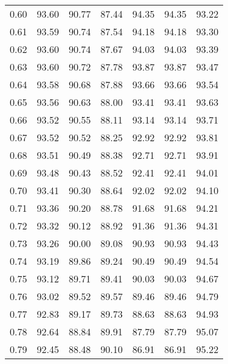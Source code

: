 \begin{tabular}{|c|c|c|c|c|c|c|}
      0.60 &     93.60 &     90.77 &      87.44 &   94.35 &      94.35 &         93.22 \\
      0.61 &     93.59 &     90.74 &      87.54 &   94.18 &      94.18 &         93.30 \\
      0.62 &     93.60 &     90.74 &      87.67 &   94.03 &      94.03 &         93.39 \\
      0.63 &     93.60 &     90.72 &      87.78 &   93.87 &      93.87 &         93.47 \\
      0.64 &     93.58 &     90.68 &      87.88 &   93.66 &      93.66 &         93.54 \\
      0.65 &     93.56 &     90.63 &      88.00 &   93.41 &      93.41 &         93.63 \\
      0.66 &     93.52 &     90.55 &      88.11 &   93.14 &      93.14 &         93.71 \\
      0.67 &     93.52 &     90.52 &      88.25 &   92.92 &      92.92 &         93.81 \\
      0.68 &     93.51 &     90.49 &      88.38 &   92.71 &      92.71 &         93.91 \\
      0.69 &     93.48 &     90.43 &      88.52 &   92.41 &      92.41 &         94.01 \\
      0.70 &     93.41 &     90.30 &      88.64 &   92.02 &      92.02 &         94.10 \\
      0.71 &     93.36 &     90.20 &      88.78 &   91.68 &      91.68 &         94.21 \\
      0.72 &     93.32 &     90.12 &      88.92 &   91.36 &      91.36 &         94.31 \\
      0.73 &     93.26 &     90.00 &      89.08 &   90.93 &      90.93 &         94.43 \\
      0.74 &     93.19 &     89.86 &      89.24 &   90.49 &      90.49 &         94.54 \\
      0.75 &     93.12 &     89.71 &      89.41 &   90.03 &      90.03 &         94.67 \\
      0.76 &     93.02 &     89.52 &      89.57 &   89.46 &      89.46 &         94.79 \\
      0.77 &     92.83 &     89.17 &      89.73 &   88.63 &      88.63 &         94.93 \\
      0.78 &     92.64 &     88.84 &      89.91 &   87.79 &      87.79 &         95.07 \\
      0.79 &     92.45 &     88.48 &      90.10 &   86.91 &      86.91 &         95.22 \\

\end{tabular}
